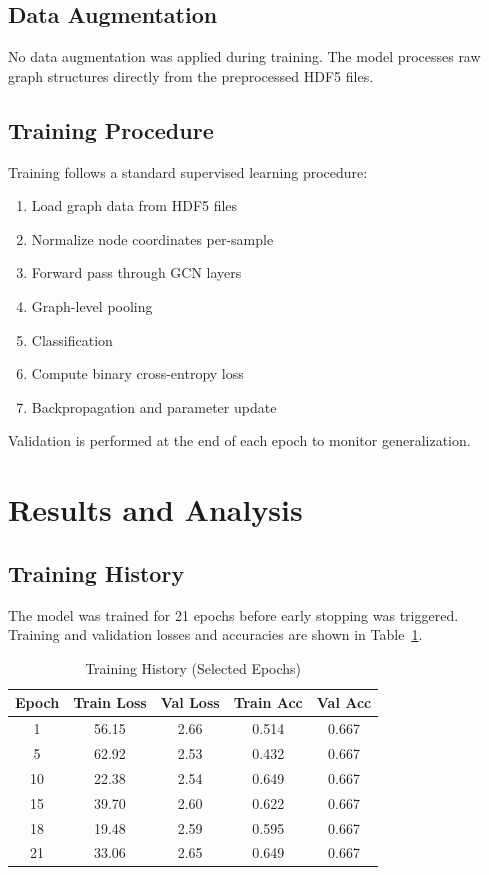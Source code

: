 \documentclass[11pt,a4paper]{article}
\begin{document}
\subsection{Data Augmentation}

No data augmentation was applied during training. The model processes raw graph structures directly from the preprocessed HDF5 files.

\subsection{Training Procedure}

Training follows a standard supervised learning procedure:
\begin{enumerate}
    \item Load graph data from HDF5 files
    \item Normalize node coordinates per-sample
    \item Forward pass through GCN layers
    \item Graph-level pooling
    \item Classification
    \item Compute binary cross-entropy loss
    \item Backpropagation and parameter update
\end{enumerate}

Validation is performed at the end of each epoch to monitor generalization.

\section{Results and Analysis}

\subsection{Training History}

The model was trained for 21 epochs before early stopping was triggered. Training and validation losses and accuracies are shown in Table~\ref{tab:training_history}.

\begin{table}[H]
\centering
\caption{Training History (Selected Epochs)}
\label{tab:training_history}
\scriptsize
\begin{tabular}{ccccc}
\toprule
\textbf{Epoch} & \textbf{Train Loss} & \textbf{Val Loss} & \textbf{Train Acc} & \textbf{Val Acc} \\
\midrule
1 & 56.15 & 2.66 & 0.514 & 0.667 \\
5 & 62.92 & 2.53 & 0.432 & 0.667 \\
10 & 22.38 & 2.54 & 0.649 & 0.667 \\
15 & 39.70 & 2.60 & 0.622 & 0.667 \\
18 & 19.48 & 2.59 & 0.595 & 0.667 \\
21 & 33.06 & 2.65 & 0.649 & 0.667 \\
\bottomrule
\end{tabular}
\end{table}
\end{document}
